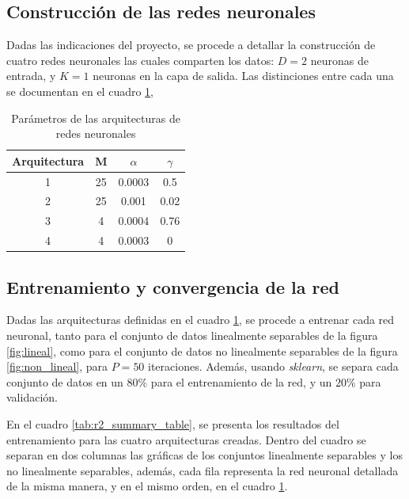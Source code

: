 \documentclass{article}
\begin{document}
 

\subsection{Construcción de las redes neuronales}

Dadas las indicaciones del proyecto, se procede a detallar la construcción de cuatro redes neuronales las cuales comparten los datos: $D=2$ neuronas de entrada, y $K=1$ neuronas en la capa de salida. Las distinciones entre cada una se documentan en el cuadro \ref{tab:neural_net_arquis},

\newpage
\begin{table}[h!]
    \centering
    \begin{tabular}{@{}cccc@{}}
    \toprule
    Arquitectura & M & $\alpha$ & $\gamma$ \\ \midrule
    1 & 25 & 0.0003 & 0.5 \\
    2 & 25 & 0.001 & 0.02 \\
    3 & 4 & 0.0004 & 0.76 \\
    4 & 4 & 0.0003 & 0 \\ \bottomrule
    \end{tabular}
    \caption{Parámetros de las arquitecturas de redes neuronales}
    \label{tab:neural_net_arquis}
\end{table}

\subsection{Entrenamiento y convergencia de la red}

Dadas las arquitecturas definidas en el cuadro \ref{tab:neural_net_arquis}, se procede a entrenar cada red neuronal, tanto para el conjunto de datos linealmente separables de la figura \ref{fig:lineal}, como para el conjunto de datos no linealmente separables de la figura \ref{fig:non_lineal}, para $P=50$ iteraciones. Además, usando \textit{sklearn}, se separa cada conjunto de datos en un $80\%$ para el entrenamiento de la red, y un $20\%$ para validación. 

En el cuadro \ref{tab:r2_summary_table}, se presenta los resultados del entrenamiento para las cuatro arquitecturas creadas. Dentro del cuadro se separan en dos columnas las gráficas de los conjuntos linealmente separables y los no linealmente separables, además, cada fila representa la red neuronal detallada de la misma manera, y en el mismo orden, en el cuadro \ref{tab:neural_net_arquis}.
\end{document}
